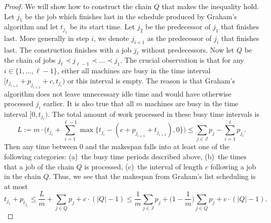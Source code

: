   \begin{proof} %
We will show how to construct the chain $Q$ that makes the inequality hold. Let $j_1$ be the job which finishes last
in the schedule produced by Graham's algorithm and let $t_{j_1}$ be its start time. Let $j_2$ be the predecessor of $j_1$
that finishes last. More generally in step $i$, we denote $j_{i+1}$ as the predecessor of $j_i$ that finishes last.
The construction finishes with a job $j_{\ell}$ without predecessors. 
Now let $Q$ be the chain of jobs $j_{\ell} \prec j_{\ell-1} \prec \ldots \prec j_1$. 
The crucial observation is that for any $i \in \{ 1,\ldots,\ell-1\}$, 
either all machines are busy in the time interval $[t_{j_{i+1}}+p_{j_{i+1}}+c,t_{j_{i}})$  or this interval is empty. 
The reason is that Graham's algorithm does not leave unnecessary idle time and would have otherwise processed $j_{i}$ earlier.
It is also true that all $m$ machines are busy in the time interval $[0,t_{j_{\ell}})$.
  The total amount of work processed in these busy time intervals is
	\[
	L := m\cdot\Big( t_{j_{\ell}}+ \sum_{i=1}^{\ell-1}\max \{t_{j_{i}}-(c+p_{j_{i+1}}+t_{j_{i+1}}), 0\}\Big)\le \sum_{j \in J} p_j - \sum_{i=1}^{\ell}p_{j_i}.
      \]
      Then any time between $0$ and the makespan falls into at least one of the following categories: 
      (a)~the busy time periods described above, (b)~the times that a job of the chain $Q$ is processed, 
      (c)~the interval of length $c$ following a job in the chain $Q$.
	Thus, we see that the makespan from Graham's list scheduling is at most
	\[
  t_{j_{1}}+p_{t_{j_{1}}} \leq \frac{L}{m} + \sum_{j \in Q} p_j + c \cdot (|Q|-1) \leq \frac{1}{m} \sum_{j \in J} p_j+\Big(1-\frac{1}{m}\Big)\sum_{j \in Q} p_{j}+c\cdot(|Q|-1).
	\]
      \end{proof}


